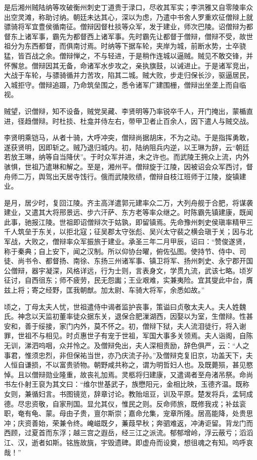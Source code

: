 \documentclass[12pt,UTF8]{ctexbook}
\begin{document}
是后湘州贼陆纳等攻破衡州刺史丁道贵于渌口，尽收其军实；李洪雅又自零陵率众出空灵滩，称助讨纳。朝廷未达其心，深以为虑，乃遣中书舍人罗重欢征僧辩上就骠骑将军宜豊侯循南征。僧辩因督杜掞等众军，发于建业，师次巴陵。诏僧辩为都督东上诸军事，霸先为都督西上诸军事。先时霸先让都督于僧辩，僧辩不受，故世祖分为东西都督，而俱南讨焉。时纳等下据车轮，夹岸为城，前断水势，士卒骁猛，皆百战之余。僧辩惮之，不与轻进，于是稍作连城以逼贼。贼见不敢交锋，并怀懈怠。僧辩因其无备，命诸军水步攻之，亲执旗鼓，以诫进止。于是诸军竞出，大战于车轮，与骠骑循并力苦攻，陷其二城。贼大败，步走归保长沙，驱逼居民，入城拒守。僧辩追蹑，乃命筑垒围之，悉令诸军广建围栅，僧辩出坐垄上而自临视。

贼望，识僧辩，知不设备，贼党吴藏、李贤明等乃率锐卒千人，开门掩出，蒙楯直进，径趋僧辩。时杜掞、杜龛并侍左右，带甲卫者止百余人，因下遣人与贼交战。

李贤明乘铠马，从者十骑，大呼冲突，僧辩尚据胡床，不为之动。于是指挥勇敢，遂获贤明，因即斩之。贼乃退归城内。初，陆纳阻兵内逆，以王琳为辞，云“朝廷若放王琳，纳等自当降伏”。于时众军并进，未之许也。而武陵王拥众上流，内外骇惧，世祖乃遣琳和解之。至是，湘州平。僧辩旋于江陵，因被诏会众军西讨，督舟师二万，舆驾出天居寺饯行。俄而武陵败绩，僧辩自枝江班师于江陵，旋镇建业。

是月，居少时，复回江陵。齐主高洋遣郭元建率众二万，大列舟舰于合肥，将谋袭建业，又遣其大将邢景远、步六汗萨、东方老等率众继之。时陈霸先镇建康，既闻此事，驰报江陵。世祖即诏僧辩次于姑孰，即留镇焉。先命豫州刺史侯瑱率精甲三千人筑垒于东关，以拒北寇；征吴郡太守张彪、吴兴太守裴之横会瑱于关；因与北军战，大败之，僧辩率众军振旅于建业。承圣三年二月甲辰，诏曰：“赞俊遂贤，称于秦典；自上安下，闻之汉制。所以仰协台曜，俯佐弘图。使持节、侍中、司徒、尚书令、都督扬、南徐、东扬三州诸军事、镇卫将军、扬州刺史、永宁郡开国公僧辩，器宇凝深，风格详远，行为士则，言表身文，学贯九流，武该七略。顷岁征讨，自西徂东；师不疲劳，民无怨讟；王业艰难，实兼夷险。宜其燮此中台，膺兹上将；寄之经野，匡我朝猷。加太尉、车骑大将军，余悉如故。”

顷之，丁母太夫人忧，世祖遣侍中谒者监护丧事，策谥曰贞敬太夫人。夫人姓魏氏。神念以天监初董率徒众据东关，退保合肥漅湖西，因娶以为室，生僧辩。性甚安和，善于绥接，家门内外，莫不怀之。初，僧辩下狱，夫人流泪徒行，将入谢罪，世祖不与相见。时贞惠世子有宠于世祖，军国大事多关领焉。夫人诣阁，自陈无训，涕泗呜咽，众并怜之。及僧辩免出，夫人深相责励，辞色俱严，云：“人之事君，惟须忠烈，非但保祐当世，亦乃庆流子孙。”及僧辩克复旧京，功盖天下，夫人恒自谦损，不以富贵骄物。朝野咸共称之，谓为明哲妇人也。及既薨殒，甚见愍悼。且以僧辩勋业隆重，故丧礼加焉。灵柩将归建康，又遣谒者至舟渚吊祭。命尚书左仆射王裒为其文曰：“维尔世基武子，族懋阳元，金相比映，玉德齐温。既称女则，兼循妇言。书图镜览，辞章讨论。教贻俎豆，训及平原。楚发将兵，孟轲成德。尽忠资敬，自家刑国。显允其仪，惟民之则。反命师旅，既修我戎；补兹衮职，奄有龟、蒙。母由子贵，亶尔斯崇；嘉命允集，宠章所隆。居高能降，处贵思冲；庆资善始，荣兼令终。崦嵫既夕，蒹葭早秋；奔驷难返，冲涛讵留。背龙门而西顾，过夏首而东浮；越三宫之遐岳，经三江之派流。郁郁增岭，浮云蔽亏；滔滔江、汉，逝者如斯。铭旌故旐，宇毁遗碑。即虚舟而设奠，想徂魂之有知。呜呼哀哉！”
\end{document}
